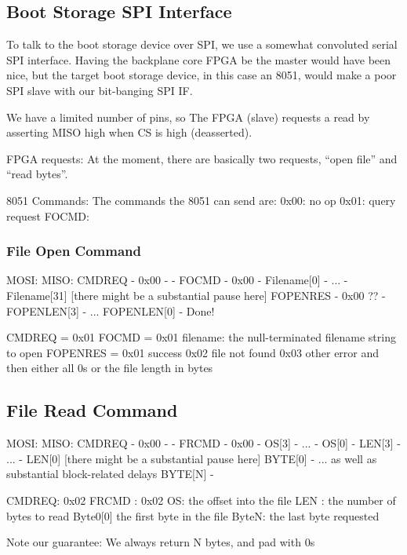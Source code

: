 \subsection{Boot Storage SPI Interface}

To talk to the boot storage device over SPI, we use a somewhat
convoluted serial SPI interface. Having the backplane core FPGA be the
master would have been nice, but the target boot storage device, in this
case an 8051, would make a poor SPI slave with our bit-banging SPI IF. 

We have a limited number of pins, so The FPGA (slave) requests a read
by asserting MISO high when CS is high (deasserted). 

FPGA requests: At the moment, there are basically two requests, ``open
file'' and ``read bytes''.

8051 Commands: The commands the 8051 can send are: 
0x00: no op
0x01: query request
FOCMD: 
\subsubsection{File Open Command}
MOSI:          MISO:
CMDREQ          - 
 0x00           -
  -            FOCMD
  -            0x00
  -            Filename[0]
  -             ...
  -            Filename[31]
     [there might be a substantial pause here]
FOPENRES         -
0x00 ??            -
FOPENLEN[3]      -
...
FOPENLEN[0]      - 
Done!


CMDREQ = 0x01
FOCMD  = 0x01
filename: the null-terminated filename string to open
FOPENRES = 0x01 success
           0x02 file not found
           0x03 other error
and then either all 0s or the file length in bytes


\subsection{File Read Command}
MOSI:           MISO:
CMDREQ            -
0x00              - 
  -             FRCMD
  -             0x00
  -              OS[3]
  -              ...
  -              OS[0]
  -             LEN[3]
  -             ... 
  -             LEN[0]
   [there might be a substantial pause here]
BYTE[0]           -
 ...              as well as substantial block-related delays
BYTE[N]           - 
  
CMDREQ: 0x02
FRCMD : 0x02
OS: the offset into the file
LEN : the number of bytes to read
Byte0[0] the first byte in the file
ByteN: the last byte requested

Note our guarantee: We always return N bytes, and pad with 0s


